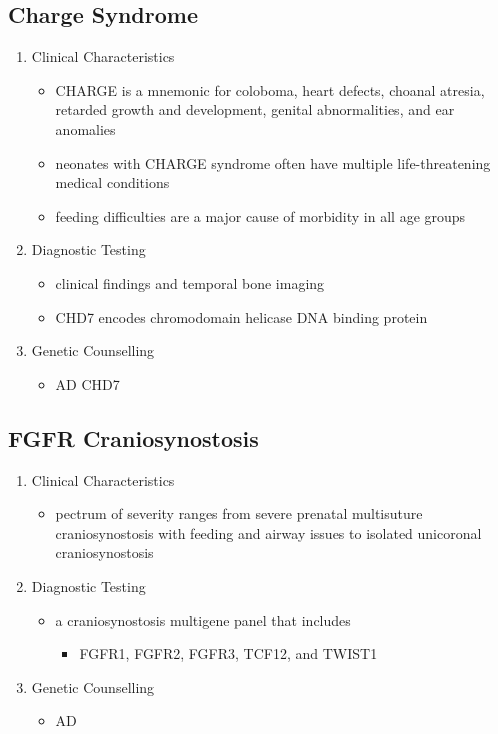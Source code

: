 \documentclass[12pt]{scrartcl}
\begin{document}
\subsection{Charge Syndrome}
\label{sec:org662849e}
\begin{enumerate}
\item Clinical Characteristics
\label{sec:org337286d}
\begin{itemize}
\item CHARGE is a mnemonic for coloboma, heart defects, choanal atresia,
retarded growth and development, genital abnormalities, and ear
anomalies
\item neonates with CHARGE syndrome often have multiple life-threatening
medical conditions
\item feeding difficulties are a major cause of
morbidity in all age groups
\end{itemize}
\item Diagnostic Testing
\label{sec:orge5c4d66}
\begin{itemize}
\item clinical findings and temporal bone imaging
\item CHD7 encodes chromodomain helicase DNA binding protein
\end{itemize}
\item Genetic Counselling
\label{sec:orgc87128a}
\begin{itemize}
\item AD CHD7
\end{itemize}
\end{enumerate}
\subsection{FGFR Craniosynostosis}
\label{sec:org9eb1f1e}
\begin{enumerate}
\item Clinical Characteristics
\label{sec:org0027227}
\begin{itemize}
\item pectrum of severity ranges from severe prenatal multisuture
craniosynostosis with feeding and airway issues to isolated
unicoronal craniosynostosis
\end{itemize}
\item Diagnostic Testing
\label{sec:org60d4a87}
\begin{itemize}
\item a craniosynostosis multigene panel that includes
\begin{itemize}
\item FGFR1, FGFR2, FGFR3, TCF12, and TWIST1
\end{itemize}
\end{itemize}
\item Genetic Counselling
\label{sec:orgaf05dd3}
\begin{itemize}
\item AD
\end{itemize}
\end{enumerate}
\end{document}
